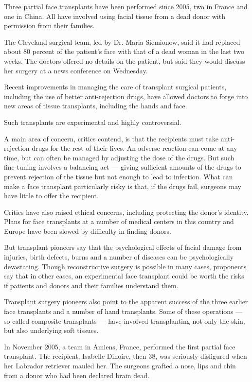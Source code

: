 Three partial face transplants have been performed since 2005, two in
France and one in China. All have involved using facial tissue from a
dead donor with permission from their families.

The Cleveland surgical team, led by Dr. Maria Siemionow, said it had
replaced about 80 percent of the patient's face with that of a dead
woman in the last two weeks. The doctors offered no details on the
patient, but said they would discuss her surgery at a news conference on
Wednesday.

Recent improvements in managing the care of transplant surgical
patients, including the use of better anti-rejection drugs, have allowed
doctors to forge into new areas of tissue transplants, including the
hands and face.

Such transplants are experimental and highly controversial.

A main area of concern, critics contend, is that the recipients must
take anti-rejection drugs for the rest of their lives. An adverse
reaction can come at any time, but can often be managed by adjusting the
dose of the drugs. But such fine-tuning involves a balancing act ---
giving sufficient amounts of the drugs to prevent rejection of the
tissue but not enough to lead to infection. What can make a face
transplant particularly risky is that, if the drugs fail, surgeons may
have little to offer the recipient.

Critics have also raised ethical concerns, including protecting the
donor's identity. Plans for face transplants at a number of medical
centers in this country and Europe have been slowed by difficulty in
finding donors.

But transplant pioneers say that the psychological effects of facial
damage from injuries, birth defects, burns and a number of diseases can
be psychologically devastating. Though reconstructive surgery is
possible in many cases, proponents say that in other cases, an
experimental face transplant could be worth the risks if patients and
donors and their families understand them.

Transplant surgery pioneers also point to the apparent success of the
three earlier face transplants and a number of hand transplants. Some of
these operations --- so-called composite transplants --- have involved
transplanting not only the skin, but also underlying soft tissues.

In November 2005, a team in Amiens, France, performed the first partial
face transplant. The recipient, Isabelle Dinoire, then 38, was seriously
disfigured when her Labrador retriever mauled her. The surgeons grafted
a nose, lips and chin from a donor who had been declared brain dead.

